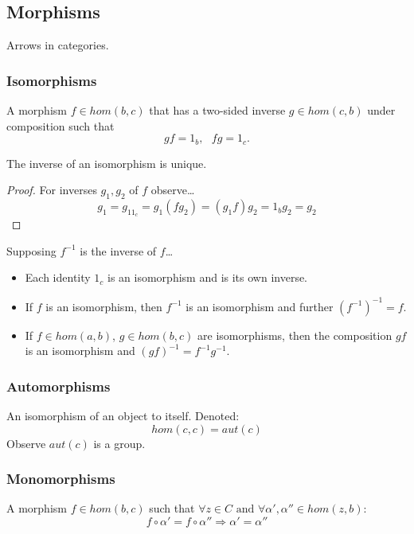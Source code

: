 \subsection{Morphisms}\label{morphism}
Arrows in categories.

\subsubsection{Isomorphisms}\label{isomorphism}
A morphism $f \in hom(b,c)$ that has a two-sided inverse $g \in hom(c,b)$ under composition such that
$$gf = 1_b, \textrm{ } fg = 1_c.$$

\begin{proposition}
The inverse of an isomorphism is unique.
\end{proposition}

\begin{proof}
For inverses $g_1,g_2$ of $f$ observe\dots
$$g_1 = g_11_c = g_1(fg_2) = (g_1f)g_2 = 1_bg_2 = g_2$$
\end{proof}

\begin{proposition}
Supposing $f^{-1}$ is the inverse of $f$\dots
\begin{itemize}
  \item Each identity $1_c$ is an isomorphism and is its own inverse.
  \item If $f$ is an isomorphism, then $f^{-1}$ is an isomorphism and further $(f^{-1})^{-1} = f$.
  \item If $f \in hom(a,b)$, $g \in hom(b,c)$ are isomorphisms, then the composition $gf$ is an isomorphism and $(gf)^{-1} = f^{-1}g^{-1}$. 
\end{itemize}
\end{proposition}

\subsubsection{Automorphisms}\label{automorphism}
An isomorphism of an object to itself. Denoted:
$$hom(c,c) = aut(c)$$
Observe $aut(c)$ is a group.

\subsubsection{Monomorphisms}\label{monomorphism}
A morphism $f \in hom(b,c)$ such that $\forall z \in C \textrm{ and } \forall \alpha',\alpha'' \in hom(z,b)$:
$$f\circ\alpha'=f\circ\alpha'' \Rightarrow \alpha'=\alpha''$$


